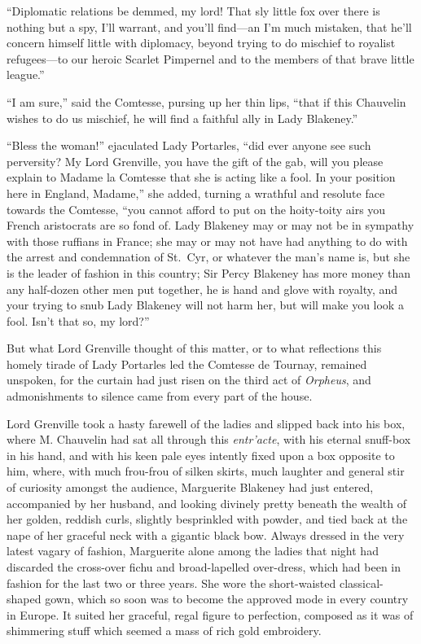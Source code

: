 \documentclass[paper=5.5in:8.5in,BCOR=7mm,twoside,DIV=calc,12pt,usegeometry,chapterprefix,endperiod,headings=big]{scrbook}
\begin{document}
\enquote{Diplomatic relations be demmed, my lord! That sly little fox over there is nothing but a spy, I'll warrant, and you'll find---an I'm much mistaken, that he'll concern himself little with diplomacy, beyond trying to do mischief to royalist refugees---to our heroic Scarlet Pimpernel and to the members of that brave little league.}

\enquote{I am sure,} said the Comtesse, pursing up her thin lips, \enquote{that if this Chauvelin wishes to do us mischief, he will find a faithful ally in Lady Blakeney.}

\enquote{Bless the woman!} ejaculated Lady Portarles, \enquote{did ever anyone see such perversity? My Lord Grenville, you have the gift of the gab, will you please explain to Madame la Comtesse that she is acting like a fool. In your position here in England, Madame,} she added, turning a wrathful and resolute face towards the Comtesse, \enquote{you cannot afford to put on the hoity-toity airs you French aristocrats are so fond of. Lady Blakeney may or may not be in sympathy with those ruffians in France; she may or may not have had anything to do with the arrest and condemnation of St.~Cyr, or whatever the man's name is, but she is the leader of fashion in this country; Sir Percy Blakeney has more money than any half-dozen other men put together, he is hand and glove with royalty, and your trying to snub Lady Blakeney will not harm her, but will make you look a fool. Isn't that so, my lord?}

But what Lord Grenville thought of this matter, or to what reflections this homely tirade of Lady Portarles led the Comtesse de Tournay, remained unspoken, for the curtain had just risen on the third act of \textit{Orpheus}, and admonishments to silence came from every part of the house.

Lord Grenville took a hasty farewell of the ladies and slipped back into his box, where M. Chauvelin had sat all through this \textit{entr'acte}, with his eternal snuff-box in his hand, and with his keen pale eyes intently fixed upon a box opposite to him, where, with much frou-frou of silken skirts, much laughter and general stir of curiosity amongst the audience, Marguerite Blakeney had just entered, accompanied by her husband, and looking divinely pretty beneath the wealth of her golden, reddish curls, slightly besprinkled with powder, and tied back at the nape of her graceful neck with a gigantic black bow. Always dressed in the very latest vagary of fashion, Marguerite alone among the ladies that night had discarded the cross-over fichu and broad-lapelled over-dress, which had been in fashion for the last two or three years. She wore the short-waisted classical-shaped gown, which so soon was to become the approved mode in every country in Europe. It suited her graceful, regal figure to perfection, composed as it was of shimmering stuff which seemed a mass of rich gold embroidery.
\end{document}
